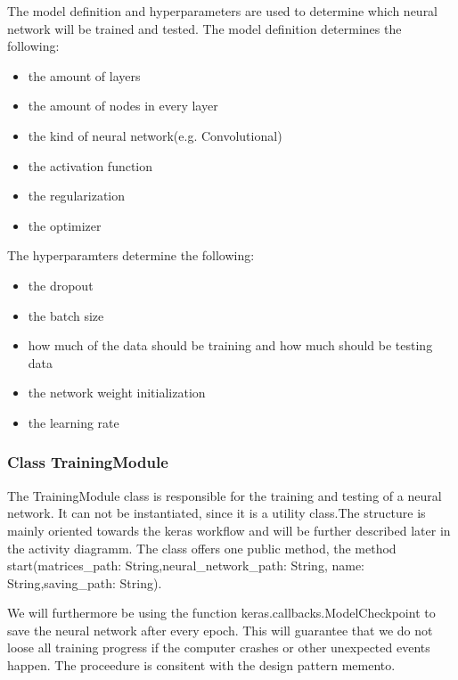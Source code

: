 \documentclass[parskip=full]{scrartcl}
\begin{document}
The model definition and hyperparameters are used to determine which neural network will be trained and tested. The model definition determines the following:
\begin{itemize}
\item the amount of layers
\item the amount of nodes in every layer
\item the kind of neural network(e.g. Convolutional)
\item the activation function
\item the regularization
\item the optimizer
\end{itemize}

The hyperparamters determine the following:

\begin{itemize}
\item the dropout
\item the batch size
\item how much of the data should be training and how much should be testing data
\item the network weight initialization
\item the learning rate
\end{itemize}

\subsubsection{Class TrainingModule}
The TrainingModule class is responsible for the training and testing of a neural network.
It can not be instantiated, since it is a utility class.The structure is mainly oriented towards the keras workflow and will be further described later in the activity diagramm.
The class offers one public method, the method start(matrices\_path: String,neural\_network\_path: String,
name: String,saving\_path: String). \newline

We will furthermore be using the function keras.callbacks.ModelCheckpoint to save the neural network after every epoch. This will guarantee that we do not loose all training progress if the computer crashes or other unexpected events happen. The proceedure is consitent with the design pattern \gls{memento}.
\end{document}
